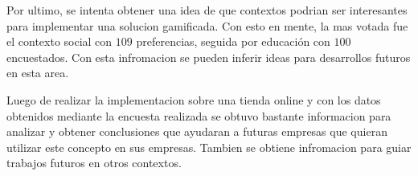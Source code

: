 
Por ultimo, se intenta obtener una idea de que contextos podrian ser interesantes para implementar una
solucion gamificada. Con esto en mente, la mas votada fue el contexto social con $109$ preferencias, 
seguida por educación con $100$ encuestados. Con esta infromacion se pueden inferir ideas para 
desarrollos futuros en esta area.


Luego de realizar la implementacion {\GAM} sobre una tienda online y con los datos obtenidos mediante
la encuesta realizada se obtuvo bastante informacion para analizar y obtener conclusiones que ayudaran 
a futuras empresas que quieran utilizar este concepto en sus empresas. Tambien se obtiene infromacion
para guiar trabajos futuros en otros contextos.
